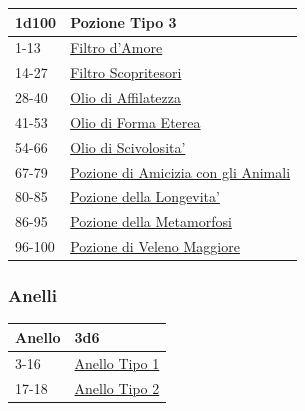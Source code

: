 \begin{multicols}{2}
{{\small\begin{tabularx}{\linewidth}{ll}
		\toprule
\rowcolor{gray!20}\textbf{1d100} & \textbf{Pozione Tipo 3}\\
\toprule
1-13& \hyperlink{Filtro d'Amore}{Filtro d'Amore}\\
\rowcolor{gray!20}14-27 & \hyperlink{Filtro Scopritesori}{Filtro Scopritesori}\\
28-40 & \hyperlink{Olio di Affilatezza}{Olio di Affilatezza}\\
\rowcolor{gray!20}41-53 & \hyperlink{Olio di Forma Eterea}{Olio di Forma Eterea}\\
54-66 & \hyperlink{Olio di Scivolosita'}{Olio di Scivolosita'}\\
\rowcolor{gray!20}67-79 & \hyperlink{Pozione di Amicizia congli Animali}{Pozione di Amicizia con gli Animali}\\
80-85 & \hyperlink{Pozione della Longevita'}{Pozione della Longevita'}\\
\rowcolor{gray!20}86-95 & \hyperlink{Pozione della Metamorfosi}{Pozione della Metamorfosi}\\
96-100&\hyperlink{pozionifiltri}{Pozione di Veleno Maggiore}
\end{tabularx}}

\subsubsection{Anelli}\hypertarget{anellimagici}{}\label{anellimagici}

{\small\begin{tabularx}{\linewidth}{ll}
		\toprule
\rowcolor{gray!20}\textbf{Anello}&\textbf{3d6}\\
\toprule
3-16&\hyperlink{Pozione Tipo 3}{Anello Tipo 1} \\
\rowcolor{gray!20}17-18&\hyperlink{Pozione Tipo 3}{Anello Tipo 2}
\end{tabularx}}

\medskip\hypertarget{Anello Tipo 1}{}

}
\end{multicols}
